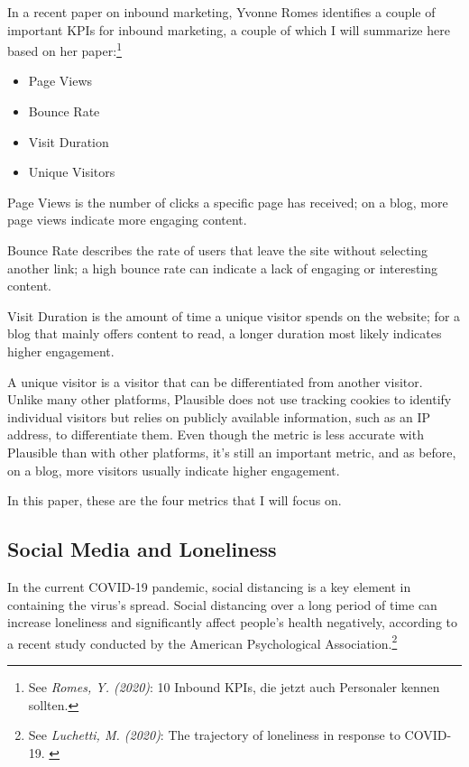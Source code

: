In a recent paper on inbound marketing, Yvonne Romes identifies a couple of important KPIs for inbound marketing, a couple of which I will summarize here based on her paper:\footnote{See \textit{Romes, Y. (2020)}: 10 Inbound KPIs, die jetzt auch Personaler kennen sollten.\cite{inboundKPI}}

\begin{itemize}
\item Page Views
\item Bounce Rate
\item Visit Duration
\item Unique Visitors
\end{itemize}

Page Views is the number of clicks a specific page has received; on a blog, more page views indicate more engaging content.

Bounce Rate describes the rate of users that leave the site without selecting another link; a high bounce rate can indicate a lack of engaging or interesting content.

Visit Duration is the amount of time a unique visitor spends on the website; for a blog that mainly offers content to read, a longer duration most likely indicates higher engagement.

A unique visitor is a visitor that can be differentiated from another visitor. Unlike many other platforms, Plausible does not use tracking cookies to identify individual visitors but relies on publicly available information, such as an IP address, to differentiate them. Even though the metric is less accurate with Plausible than with other platforms, it's still an important metric, and as before, on a blog, more visitors usually indicate higher engagement.

In this paper, these are the four metrics that I will focus on.

\subsection{Social Media and Loneliness}

In the current COVID-19 pandemic, social distancing is a key element in containing the virus's spread. Social distancing over a long period of time can increase loneliness and significantly affect people's health negatively, according to a recent study conducted by the American Psychological Association.\footnote{See \textit{Luchetti, M. (2020)}: The trajectory of loneliness in response to COVID-19. \cite{apaLoneliness}}

